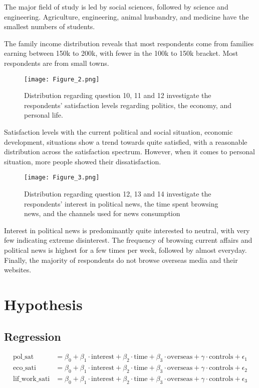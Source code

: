 \documentclass{article}
\begin{document}
The major field of study is led by social sciences, followed by science and engineering. Agriculture, engineering, animal husbandry, and medicine have the smallest numbers of students.

The family income distribution reveals that most respondents come from families earning between 150k to 200k, with fewer in the 100k to 150k bracket. Most respondents are from small towns.


\begin{figure}[H]
\centering
\texttt{[image: Figure\_2.png]}
\caption{Distribution regarding question 10, 11 and 12 investigate the respondents' satisfaction levels regarding politics, the economy, and personal life.}
\label{fig:Dependent variables}
\end{figure}
Satisfaction levels with the current political and social situation, economic development, situations show a trend towards quite satisfied, with a reasonable distribution across the satisfaction spectrum. However, when it comes to personal situation, more people showed their dissatisfaction.
\begin{figure}[H]
\centering
\texttt{[image: Figure\_3.png]}
\caption{Distribution regarding question 12, 13 and 14 investigate the respondents' interest in political news, the time spent browsing news, and the channels used for news consumption}
\label{fig:independent variables}
\end{figure}
Interest in political news is predominantly quite interested to neutral, with very few indicating extreme disinterest. The frequency of browsing current affairs and political news is highest for a few times per week, followed by almost everyday. Finally, the majority of respondents do not browse overseas media and their websites.
\section{Hypothesis}



\subsection{Regression}
\begin{equation}
\begin{aligned}
\text{pol\_sat} &= \beta_0 + \beta_1 \cdot \text{interest} + \beta_2 \cdot \text{time} + \beta_3 \cdot \text{overseas} + \gamma \cdot \text{controls} + \epsilon_1 \nonumber \\
\text{eco\_sati} &= \beta_0 + \beta_1 \cdot \text{interest} + \beta_2 \cdot \text{time} + \beta_3 \cdot \text{overseas} + \gamma \cdot \text{controls} + \epsilon_2 \nonumber \\
\text{lif\_work\_sati} &= \beta_0 + \beta_1 \cdot \text{interest} + \beta_2 \cdot \text{time} + \beta_3 \cdot \text{overseas} + \gamma \cdot \text{controls} + \epsilon_3 \nonumber
\end{aligned}
\end{equation}
\end{document}
